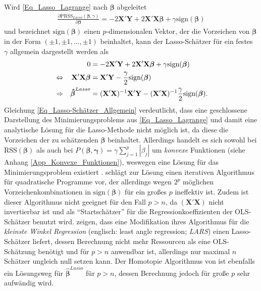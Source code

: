 \documentclass[12pt, a4paper]{report}\usepackage[]{graphicx}\usepackage[]{color}
\begin{document}
Wird \eqref{Eq_Lasso_Lagrange} nach $\boldsymbol{\beta}$ abgeleitet
\begin{align*}
\frac{\partial \text{PRSS}_{Lasso}(\boldsymbol{\beta}, \gamma)}{\partial \boldsymbol{\beta}}=-2\mathbf{X}'\mathbf{Y}+2\mathbf{X}'\mathbf{X}\boldsymbol{\beta}+\gamma\text{sign}(\boldsymbol{\beta})
\end{align*}
und bezeichnet $\text{sign}(\boldsymbol{\beta})$ einen $p$-dimensionalen Vektor, der die Vorzeichen von $\boldsymbol{\beta}$ in der Form $(\pm1,\pm1,\dots, \pm1)$ beinhaltet, kann der Lasso-Schätzer für ein festes $\gamma$ allgemein dargestellt werden als
\begin{align}
&& 0&=-2\mathbf{X}'\mathbf{Y}+2\mathbf{X}'\mathbf{X}\boldsymbol{\beta}+\gamma\text{sign}(\boldsymbol{\beta}) \notag \\
&\Leftrightarrow &\mathbf{X}'\mathbf{X}\boldsymbol{\beta}&= \mathbf{X}'\mathbf{Y}-\frac{\gamma}{2}\text{sign}(\boldsymbol{\beta}) \notag \\
&\Rightarrow & \boldsymbol{\hat{\beta}}^{Lasso}&=(\mathbf{X}'\mathbf{X})^{-1}\mathbf{X}'\mathbf{Y}-(\mathbf{X}'\mathbf{X})^{-1}\frac{\gamma}{2}\text{sign}(\boldsymbol{\beta}) \label{Eq_Lasso-Schätzer_Allgemein}.
\end{align}
Gleichung \eqref{Eq_Lasso-Schätzer_Allgemein} verdeutlicht, dass eine geschlossene Darstellung des Minimierungsproblems aus \eqref{Eq_Lasso_Lagrange} und damit eine analytische Lösung für die Lasso-Methode nicht möglich ist, da diese die Vorzeichen der zu schätzenden $\boldsymbol{\beta}$ beinhaltet. Allerdings handelt es sich sowohl bei $\text{RSS}(\boldsymbol{\beta})$ als auch bei $P(\boldsymbol{\beta}, \boldsymbol{\gamma})=\gamma \sum_{j=1}^{p}|\beta_j|$ um \textit{konvexe} Funktionen (siehe Anhang \ref{App_Konvexe_Funktionen}), weswegen eine Lösung für das Minimierungsproblem existiert \cite{Osborne99onthe}.  schlägt zur Lösung einen iterativen Algorithmus für quadratische Programme vor, der allerdings wegen $2^p$ möglichen Vorzeichenkombinationen in $\text{sign}(\boldsymbol{\beta})$ für ein großes $p$ ineffektiv ist. Zudem ist dieser Algorithmus nicht geeignet für den Fall $p>n$, da $(\mathbf{X}'\mathbf{X})$ nicht invertierbar ist und als "`Startschätzer"' für die Regressionkoeffizienten der OLS-Schätzer benutzt wird.  zeigen, dass eine Modifikation ihres Algorithmus für die \textit{kleinste Winkel Regression} (englisch: least angle regression; \textit{LARS}) einen Lasso-Schätzer liefert, dessen Berechnung nicht mehr Ressourcen als eine OLS-Schätzung benötigt und für $p > n$ anwendbar ist, allerdings nur maximal $n$ Schätzer ungleich null setzen kann. Der Homotopie Algorithmus von  ist ebenfalls ein Lösungsweg für $\boldsymbol{\hat{\beta}}^{Lasso}$ für $p > n$, dessen Berechnung jedoch für große $p$ sehr aufwändig wird.\\
\end{document}
